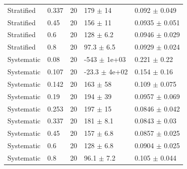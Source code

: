 \begin{tabular}{lllll}
Stratified & 0.337 & 20 & 179 $\pm$ 14 & 0.092 $\pm$ 0.049 \\
Stratified & 0.45 & 20 & 156 $\pm$ 11 & 0.0935 $\pm$ 0.051 \\
Stratified & 0.6 & 20 & 128 $\pm$ 6.2 & 0.0946 $\pm$ 0.029 \\
Stratified & 0.8 & 20 & 97.3 $\pm$ 6.5 & 0.0929 $\pm$ 0.024 \\
Systematic & 0.08 & 20 & -543 $\pm$ 1e+03 & 0.221 $\pm$ 0.22 \\
Systematic & 0.107 & 20 & -23.3 $\pm$ 4e+02 & 0.154 $\pm$ 0.16 \\
Systematic & 0.142 & 20 & 163 $\pm$ 58 & 0.109 $\pm$ 0.075 \\
Systematic & 0.19 & 20 & 194 $\pm$ 39 & 0.0957 $\pm$ 0.069 \\
Systematic & 0.253 & 20 & 197 $\pm$ 15 & 0.0846 $\pm$ 0.042 \\
Systematic & 0.337 & 20 & 181 $\pm$ 8.1 & 0.0843 $\pm$ 0.03 \\
Systematic & 0.45 & 20 & 157 $\pm$ 6.8 & 0.0857 $\pm$ 0.025 \\
Systematic & 0.6 & 20 & 128 $\pm$ 6.8 & 0.0904 $\pm$ 0.025 \\
Systematic & 0.8 & 20 & 96.1 $\pm$ 7.2 & 0.105 $\pm$ 0.044 \\
\bottomrule
\end{tabular}
